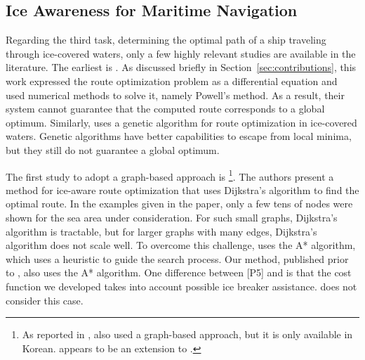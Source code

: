 %
%
%
%
%
%
%
\subsection{Ice Awareness for Maritime Navigation}
\label{sec:ice-awareness-literature}

Regarding the third task, determining the optimal path of a ship traveling through ice-covered waters, only a few highly relevant studies are available in the literature. The earliest is \cite{kotovirta2009system}. As discussed briefly in Section~\ref{sec:contributions}, this work expressed the route optimization problem as a differential equation and used numerical methods to solve it, namely Powell's method. As a result, their system cannot guarantee that the computed route corresponds to a global optimum. Similarly, \cite{choi2013application} uses a genetic algorithm for route optimization in ice-covered waters. Genetic algorithms have better capabilities to escape from local minima, but they still do not guarantee a global optimum. 

The first study to adopt a graph-based approach is \cite{nam2013simulation}\footnote{As reported in \cite{choi2013application}, \cite{Park2011} also used a graph-based approach, but it is only available in Korean. \cite{nam2013simulation} appears to be an extension to \cite{Park2011}.}. The authors present a method for ice-aware route optimization that uses Dijkstra's algorithm to find the optimal route. In the examples given in the paper, only a few tens of nodes were shown for the sea area under consideration. For such small graphs, Dijkstra's algorithm is tractable, but for larger graphs with many edges, Dijkstra's algorithm does not scale well. To overcome this challenge, \cite{choi2015arctic} uses the A* algorithm, which uses a heuristic to guide the search process. Our method, published prior to \cite{choi2015arctic}, also uses the A* algorithm. One difference between [P5] and \cite{choi2015arctic} is that the cost function we developed takes into account possible ice breaker assistance. \cite{choi2015arctic} does not consider this case.

